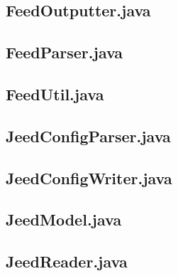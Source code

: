\documentclass[titlepage, twoside, a4paper, 12pt]{article}
\begin{document}
\newpage
\subsection{FeedOutputter.java}\label{FeedOutputter.java}
\begin{footnotesize}
  
\end{footnotesize}

\newpage
\subsection{FeedParser.java}\label{FeedParser.java}
\begin{footnotesize}
  
\end{footnotesize}

\newpage
\subsection{FeedUtil.java}\label{FeedUtil.java}
\begin{footnotesize}
  
\end{footnotesize}

\newpage
\subsection{JeedConfigParser.java}\label{JeedConfigParser.java}
\begin{footnotesize}
  
\end{footnotesize}

\newpage
\subsection{JeedConfigWriter.java}\label{JeedConfigWriter.java}
\begin{footnotesize}
  
\end{footnotesize}

\newpage
\subsection{JeedModel.java}\label{JeedModel.java}
\begin{footnotesize}
  
\end{footnotesize}

\newpage
\subsection{JeedReader.java}\label{JeedReader.java}
\begin{footnotesize}
  
\end{footnotesize}
\end{document}
